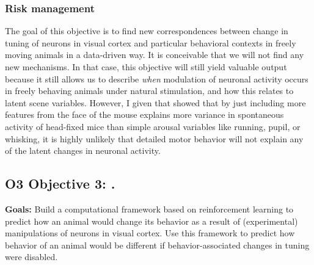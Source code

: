 \documentclass[B2,COG]{ercgrant}
\begin{document}
\subsubsection{Risk management} 
The goal of this objective is to find new correspondences between change in tuning of neurons in visual cortex and particular behavioral contexts in freely moving animals in a data-driven way.
It is conceivable that we will not find any new mechanisms.
In that case, this objective will still yield valuable output because it still allows us to describe \textit{when} modulation of neuronal activity occurs in freely behaving animals under natural stimulation, and how this relates to latent scene variables. 
However, I given that \textcite{Stringer2019-lt} showed that by just including more features from the face of the mouse explains more variance in spontaneous activity of head-fixed mice than simple arousal variables like running, pupil, or whisking, it is highly unlikely that detailed motor behavior will not explain any of the latent changes in neuronal activity. 




\subsection{\colorbox{obj3}{\color{white} O3} Objective 3: \othreetitle .}

\textbf{Goals:} Build a computational framework based on reinforcement learning to predict how an animal would change its behavior as a result of (experimental) manipulations of neurons in visual cortex. Use this framework to predict how behavior of an animal would be different if behavior-associated changes in tuning were disabled. 
\end{document}
